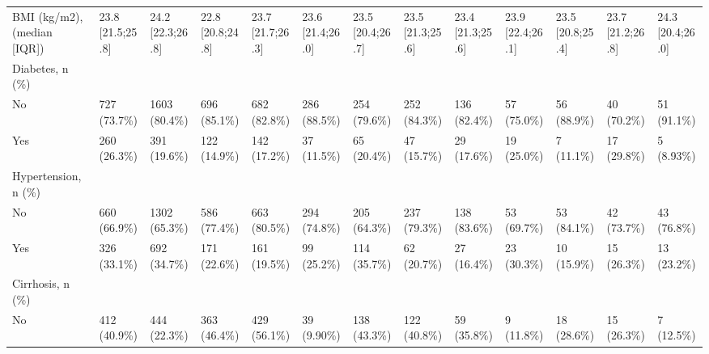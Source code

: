 \begin{landscape}
\begin{center}
\begin{longtable}{p{6.0cm}p{3.0cm}p{3.0cm}p{3.0cm}p{3.0cm}p{3.0cm}p{3.0cm}p{3.0cm}p{3.0cm}p{3.0cm}p{3.0cm}p{3.0cm}p{3.0cm}}
BMI (kg/m2), (median [IQR]) & 23.8 [21.5;25.8] & 24.2 [22.3;26.8] & 22.8 [20.8;24.8] & 23.7 [21.7;26.3] & 23.6 [21.4;26.0] & 23.5 [20.4;26.7] & 23.5 [21.3;25.6] & 23.4 [21.3;25.6] & 23.9 [22.4;26.1] & 23.5 [20.8;25.4] & 23.7 [21.2;26.8] & 24.3 [20.4;26.0] \\
Diabetes, n (\%) &                  &                  &                  &                  &                  &                  &                  &                  &                  &                  &                  &                  \\
    No &   727 (73.7\%)    &   1603 (80.4\%)   &   696 (85.1\%)    &   682 (82.8\%)    &   286 (88.5\%)    &   254 (79.6\%)    &   252 (84.3\%)    &   136 (82.4\%)    &    57 (75.0\%)    &    56 (88.9\%)    &    40 (70.2\%)    &    51 (91.1\%)    \\
    Yes &   260 (26.3\%)    &   391 (19.6\%)    &   122 (14.9\%)    &   142 (17.2\%)    &    37 (11.5\%)    &    65 (20.4\%)    &    47 (15.7\%)    &    29 (17.6\%)    &    19 (25.0\%)    &    7 (11.1\%)     &    17 (29.8\%)    &    5 (8.93\%)     \\
Hypertension, n (\%) &                  &                  &                  &                  &                  &                  &                  &                  &                  &                  &                  &                  \\
    No &   660 (66.9\%)    &   1302 (65.3\%)   &   586 (77.4\%)    &   663 (80.5\%)    &   294 (74.8\%)    &   205 (64.3\%)    &   237 (79.3\%)    &   138 (83.6\%)    &    53 (69.7\%)    &    53 (84.1\%)    &    42 (73.7\%)    &    43 (76.8\%)    \\
    Yes &   326 (33.1\%)    &   692 (34.7\%)    &   171 (22.6\%)    &   161 (19.5\%)    &    99 (25.2\%)    &   114 (35.7\%)    &    62 (20.7\%)    &    27 (16.4\%)    &    23 (30.3\%)    &    10 (15.9\%)    &    15 (26.3\%)    &    13 (23.2\%)    \\
Cirrhosis, n (\%) &                  &                  &                  &                  &                  &                  &                  &                  &                  &                  &                  &                  \\
    No &   412 (40.9\%)    &   444 (22.3\%)    &   363 (46.4\%)    &   429 (56.1\%)    &    39 (9.90\%)    &   138 (43.3\%)    &   122 (40.8\%)    &    59 (35.8\%)    &    9 (11.8\%)     &    18 (28.6\%)    &    15 (26.3\%)    &    7 (12.5\%)     \\

\end{longtable}
\end{center}
\end{landscape}
